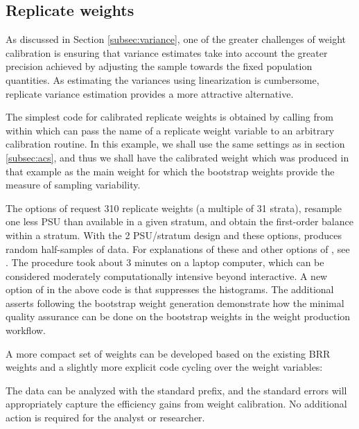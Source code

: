 \subsection{Replicate weights}

As discussed in Section \ref{subsec:variance}, one of the greater challenges
of weight calibration is ensuring that variance estimates take into account
the greater precision achieved by adjusting the sample towards the fixed
population quantities. As estimating the variances using linearization
is cumbersome, replicate variance estimation provides a more attractive
alternative.

\begin{stexample}[Example 6]

The simplest code for calibrated replicate weights is obtained by calling
 from within  \citep{kolenikov:2010}
which can pass the name of a replicate weight variable to an arbitrary
calibration routine. In this example, we shall use the same settings
as in section \ref{subsec:acs}, and thus we shall have the calibrated weight
 which was produced in that example as the main weight
for which the bootstrap weights provide the measure of sampling variability.

\begin{stlog}
\nullskip
\end{stlog}

The options of  request 310 replicate weights
(a multiple of 31 strata), resample one less PSU than available in
a given stratum, and obtain the first-order balance within a stratum.
With the 2 PSU/stratum design and these options, 
produces random half-samples of data.
For explanations of these and other options of ,
see \citet{kolenikov:2010}. The procedure took about 3 minutes
on a laptop computer, which can be considered moderately
computationally intensive beyond interactive.
A new option of  in the above code is
 that suppresses the histograms.
The additional asserts \citep{gould:2003:tip3} following the bootstrap 
weight generation demonstrate how the minimal quality assurance 
can be done on the bootstrap weights in the weight production workflow.


A more compact set of weights can be developed based on the existing
BRR weights and a slightly more explicit code cycling over the weight
variables:

\begin{stlog}
\nullskip
\end{stlog}

The data can be analyzed with the standard  prefix,
and the standard errors will appropriately capture the efficiency
gains from weight calibration. No additional action is required 
for the analyst or researcher.

\end{stexample}

